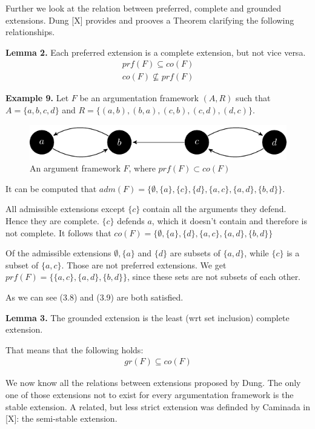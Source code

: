 \documentclass[draft,final]{vutinfth} %
\newcommand{\hl}{\par\vspace{6pt}} %
\newcommand{\cl}{\par\vspace{12pt}} %
\begin{document}
Further we look at the relation between preferred, complete and grounded extensions. Dung [X] provides and prooves a Theorem clarifying the following relationships.\hl %

\textbf{Lemma 2.}
Each preferred extension is a complete extension, but not vice versa.
\begin{align}
	prf(F)\subseteq co(F)\\
	co(F)\not\subseteq prf(F)
\end{align}\hl

\textbf{Example 9.} Let $F$ be an argumentation framework $(A,R)$ such that $A=\{a,b,c,d\}$ and $R=\{(a,b),(b,a),(c,b),(c,d),(d,c)\}$.\hl

\FloatBarrier
	\begin{figure}[!h]
		\centering
		\includegraphics[width=\linewidth]{graphs/ex3.pdf}
		\caption{An argument framework $F$, where $prf(F)\subset co(F)$}
	\end{figure}
\FloatBarrier

It can be computed that $adm(F)=\{\emptyset,\{a\},\{c\},\{d\},\{a,c\},\{a,d\},\{b,d\}\}$.\hl
All admissible extensions except $\{c\}$ contain all the arguments they defend. Hence they are complete. $\{c\}$ defends $a$, which it doesn't contain and therefore is not complete. It follows that $co(F)=\{\emptyset,\{a\},\{d\},\{a,c\},\{a,d\},\{b,d\}\}$\hl
Of the admissible extensions $\emptyset,\{a\}$ and $\{d\}$ are subsets of $\{a,d\}$, while $\{c\}$ is a subset of $\{a,c\}$. Those are not preferred extensions. We get $prf(F)=\{\{a,c\},\{a,d\},\{b,d\}\}$, since these sets are not subsets of each other.\hl
As we can see (3.8) and (3.9) are both satisfied.\cl

\textbf{Lemma 3.}
The grounded extension is the least (wrt set inclusion) complete extension.\hl
That means that the following holds:
\begin{align}
	gr(F)\subseteq co(F)
\end{align}\cl


We now know all the relations between extensions proposed by Dung. The only one of those extensions not to exist for every argumentation framework is the stable extension. A related, but less strict extension was definded by Caminada in [X]: the semi-stable extension.\hl
\end{document}
